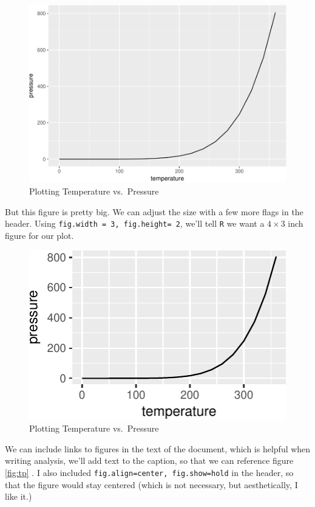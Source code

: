 \documentclass[]{article}
\begin{document}
\begin{figure}[htbp]
\centering
\includegraphics{example_rmarkdown_files/figure-latex/pressure_cap-1.pdf}
\caption{Plotting Temperature vs.~Pressure}
\end{figure}

But this figure is pretty big. We can adjust the size with a few more
flags in the header. Using \texttt{fig.width\ =\ 3,\ fig.height=\ 2},
we'll tell \texttt{R} we want a \(4\times3\) inch figure for our plot.

\begin{figure}[htbp]
\centering
\includegraphics{example_rmarkdown_files/figure-latex/pressure_cap_size-1.pdf}
\caption{Plotting Temperature vs.~Pressure}
\end{figure}

We can include links to figures in the text of the document, which is
helpful when writing analysis, we'll add text to the caption, so that we
can reference figure \ref{fig:tp} . I also included
\texttt{fig.align=\textquotesingle{}center\textquotesingle{},\ fig.show=\textquotesingle{}hold\textquotesingle{}}
in the header, so that the figure would stay centered (which is not
necessary, but aesthetically, I like it.)
\end{document}
